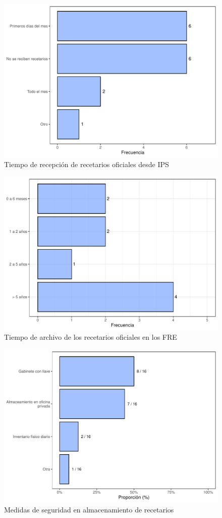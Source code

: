 \documentclass[
]{book}
\begin{document}
\begin{figure}
\includegraphics[width=0.85\linewidth]{InformeFinal_files/figure-latex/TiempoRecepcionRecOficiales-1} \caption{Tiempo de recepción de recetarios oficiales desde IPS}\label{fig:TiempoRecepcionRecOficiales}
\end{figure}

\begin{figure}
\includegraphics[width=0.85\linewidth]{InformeFinal_files/figure-latex/TiempoArchivoRecetariosOficiales-1} \caption{Tiempo de archivo de los recetarios oficiales en los FRE}\label{fig:TiempoArchivoRecetariosOficiales}
\end{figure}

\begin{figure}
\includegraphics[width=0.85\linewidth]{InformeFinal_files/figure-latex/MedidasSeguridad-Almacenamiento-1} \caption{Medidas de seguridad en almacenamiento de recetarios}\label{fig:MedidasSeguridad-Almacenamiento}
\end{figure}
\end{document}
